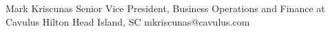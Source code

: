 

\begin{cvhonors}

  \cvhonor
    {Mark Kriscunas} %
    {Senior Vice President, Business Operations and Finance at Cavulus} %
    {Hilton Head Island, SC} %
    {mkriscunas@cavulus.com} %

\end{cvhonors}
